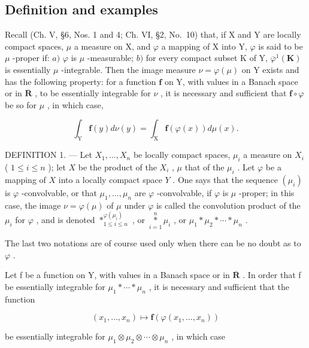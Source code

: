 \subsection{Definition and examples}

Recall (Ch. V, §6, Nos. 1 and 4; Ch. VI, §2, No.~10) that, if X and Y are locally compact spaces, \(\mu\) a measure on X, and \(\varphi\) a mapping of X into Y, \(\varphi\) is said to be \(\mu\) -proper if: \(a)\) \(\varphi\) is \(\mu\) -measurable; \(b)\) for every compact subset K of Y, \(\overline{\varphi}^1 (\mathbf{K})\) is essentially \(\mu\) -integrable. Then the image measure \(\nu = \varphi (\mu)\) on Y exists and has the following property: for a function \(\mathbf{f}\) on Y, with values in a Banach space or in \(\overline{\mathbf{R}}\) , to be essentially integrable for \(\nu\) , it is necessary and sufficient that \(\mathbf{f} \circ \varphi\) be so for \(\mu\) , in which case,

\[
\int_ {\mathrm{Y}} \mathbf {f} (y) d \nu (y) = \int_ {\mathrm{X}} \mathbf {f} (\varphi (x)) d \mu (x).
\]

DEFINITION 1. --- Let \(X_1, \ldots, X_n\) be locally compact spaces, \(\mu_i\) a measure on \(X_i\) ( \(1 \leqslant i \leqslant n\) ); let \(X\) be the product of the \(X_i\) , \(\mu\) that of the \(\mu_i\) . Let \(\varphi\) be a mapping of \(X\) into a locally compact space \(Y\) . One says that the sequence \((\mu_i)\) is \(\varphi\) -convolvable, or that \(\mu_1, \ldots, \mu_n\) are \(\varphi\) -convolvable, if \(\varphi\) is \(\mu\) -proper; in this case, the image \(\nu = \varphi(\mu)\) of \(\mu\) under \(\varphi\) is called the convolution product of the \(\mu_i\) for \(\varphi\) , and is denoted \(*^{\varphi(\mu_i)}_{1 \leqslant i \leqslant n}\) , or \(\underset{i=1}{\overset{n}{*}} \mu_i\) , or \(\mu_1 * \mu_2 * \cdots * \mu_n\) .

The last two notations are of course used only when there can be no doubt as to \(\varphi\) .

Let f be a function on Y, with values in a Banach space or in \(\overline{\mathbf{R}}\) . In order that f be essentially integrable for \(\mu_{1}*\cdots*\mu_{n}\) , it is necessary and sufficient that the function

\[
\left(x _ {1}, \dots , x _ {n}\right) \mapsto \mathbf {f} \left(\varphi \left(x _ {1}, \dots , x _ {n}\right)\right)
\]

be essentially integrable for \(\mu_{1}\otimes\mu_{2}\otimes\cdots\otimes\mu_{n}\) , in which case

